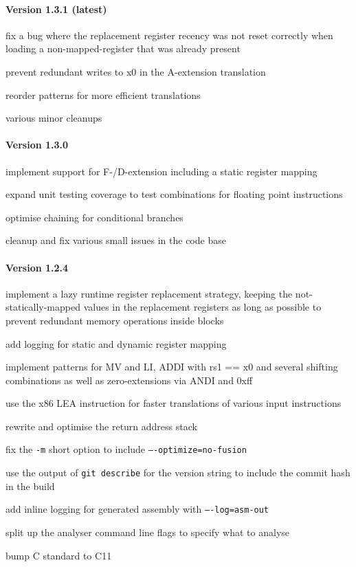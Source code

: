 \paragraph{Version 1.3.1 (latest)}
\begin{itemize*}
 	\item fix a bug where the replacement register recency was not reset correctly when loading a non-mapped-register that was already present
 	\item prevent redundant writes to x0 in the A-extension translation
 	\item reorder patterns for more efficient translations
 	\item various minor cleanups
\end{itemize*}


\paragraph{Version 1.3.0}
\begin{itemize*}
 	\item implement support for F-/D-extension including a static register mapping
 	\item expand unit testing coverage to test combinations for floating point instructions
 	\item optimise chaining for conditional branches
 	\item cleanup and fix various small issues in the code base
\end{itemize*}


\paragraph{Version 1.2.4}
\begin{itemize*}
 	\item implement a lazy runtime register replacement strategy, keeping the not-statically-mapped values in the replacement registers as long as possible to prevent redundant memory operations inside blocks
 	\item add logging for static and dynamic register mapping
 	\item implement patterns for MV and LI, ADDI with rs1 == x0 and several shifting combinations as well as zero-extensions via ANDI and 0xff
 	\item use the x86 LEA instruction for faster translations of various input instructions
 	\item rewrite and optimise the return address stack
 	\item fix the \texttt{-m} short option to include \texttt{----optimize=no-fusion}
 	\item use the output of \texttt{git describe} for the version string to include the commit hash in the build
 	\item add inline logging for generated assembly with \texttt{----log=asm-out}
 	\item split up the analyser command line flags to specify what to analyse
 	\item bump C standard to C11
\end{itemize*}


